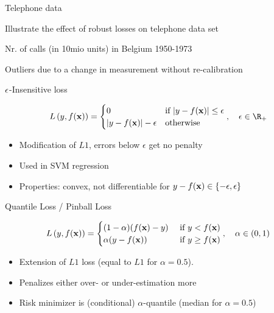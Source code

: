 \documentclass[11pt,compress,t,notes=noshow, xcolor=table]{beamer}
\begin{document}
\begin{framei}[sep=M]{Telephone data}

\item Illustrate the effect of robust losses on telephone data set 
\item Nr. of calls (in 10mio units) in Belgium 1950-1973
\item Outliers due to a change in measurement without re-calibration 

\vfill



\end{framei}


\begin{frame}{$\epsilon$-Insensitive loss}

$$
\Lxy =  \begin{cases}
0  & \text{if } |y - \fx| \le \epsilon \\
|y - \fx|-\epsilon & \text{otherwise }
\end{cases}, \quad \epsilon \in \R_{+}
$$

\begin{itemize}
\item Modification of $L1$, errors below $\epsilon$ get no penalty
\item Used in SVM regression
\item Properties: convex, not differentiable for $ y - f(\mathbf{x}) \in \{-\epsilon, \epsilon\}$
\end{itemize}

\vfill




\end{frame}


\begin{frame}{Quantile Loss / Pinball Loss}

$$
L\left(y, f(\mathbf{x})\right) = \begin{cases} (1 - \alpha) (f(\mathbf{x}) - y) & \text{ if } y < f(\mathbf{x})\\
\alpha (y - f(\mathbf{x})) & \text{ if } y \ge f(\mathbf{x})
\end{cases}, \quad \alpha \in (0, 1)
$$

\begin{itemize}
\item Extension of $L1$ loss (equal to $L1$ for $\alpha = 0.5$).
\item Penalizes either over- or under-estimation more
\item Risk minimizer is (conditional) 
$\alpha$-quantile (median for $\alpha=0.5$)
\end{itemize}

\vfill




\end{frame}
\end{document}
